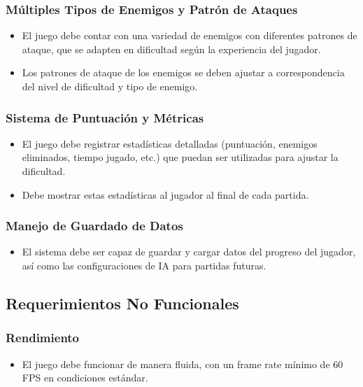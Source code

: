 \subsubsection{Múltiples Tipos de Enemigos y Patrón de Ataques}
\begin{itemize}
    \item El juego debe contar con una variedad de enemigos con diferentes patrones de ataque, que se adapten en dificultad según la experiencia del jugador.
    \item Los patrones de ataque de los enemigos se deben ajustar a correspondencia del nivel de dificultad y tipo de enemigo.
\end{itemize}

\subsubsection{Sistema de Puntuación y Métricas}
\begin{itemize}
    \item El juego debe registrar estadísticas detalladas (puntuación, enemigos eliminados, tiempo jugado, etc.) que puedan ser utilizadas para ajustar la dificultad.
    \item Debe mostrar estas estadísticas al jugador al final de cada partida.
\end{itemize}

\subsubsection{Manejo de Guardado de Datos}
\begin{itemize}
    \item El sistema debe ser capaz de guardar y cargar datos del progreso del jugador, así como las configuraciones de IA para partidas futuras.
\end{itemize}

\subsection{Requerimientos No Funcionales}

\subsubsection{Rendimiento}
\begin{itemize}
    \item El juego debe funcionar de manera fluida, con un frame rate mínimo de 60 FPS en condiciones estándar.
\end{itemize}

